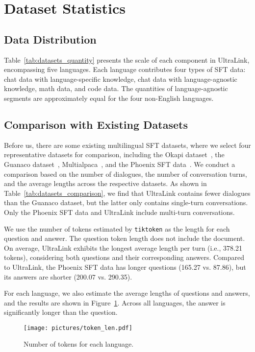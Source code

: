 \documentclass[11pt]{article}
\begin{document}
\section{Dataset Statistics}
\label{sec: data details}
\subsection{Data Distribution}

Table~\ref{tab:datasets_quantity} presents the scale of each component in UltraLink, encompassing five languages. Each language contributes four types of SFT data: chat data with language-specific knowledge, chat data with language-agnostic knowledge, math data, and code data. The quantities of language-agnostic segments are approximately equal for the four non-English languages.

\subsection{Comparison with Existing Datasets}

Before us, there are some existing multilingual SFT datasets, where we select four representative datasets for comparison, including the Okapi dataset~\cite{okapi}, the Guanaco dataset~\cite{Guanaco}, Multialpaca~\cite{polylm}, and the Phoenix SFT data~\cite{phoenix}. We conduct a comparison based on the number of dialogues, the number of conversation turns, and the average lengths across the respective datasets. As shown in Table~\ref{tab:datasets_comparison}, we find that UltraLink contains fewer dialogues than the Guanaco dataset, but the latter only contains single-turn conversations. Only the Phoenix SFT data and UltraLink include multi-turn conversations.

We use the number of tokens estimated by \texttt{tiktoken} as the length for each question and answer. The question token length does not include the document. On average, UltraLink exhibits the longest average length per turn (i.e., 378.21 tokens), considering both questions and their corresponding answers. Compared to UltraLink, the Phoenix SFT data has longer questions (165.27 vs. 87.86), but its answers are shorter (200.07 vs. 290.35).

For each language, we also estimate the average lengths of questions and answers, and the results are shown in Figure~\ref{fig:token_len_5lang}. Across all languages, the answer is significantly longer than the question.

\begin{figure}[ht]
    \centering
    \texttt{[image: pictures/token\_len.pdf]}
    \caption{Number of tokens for each language.}
    \label{fig:token_len_5lang}
\end{figure}
\end{document}
